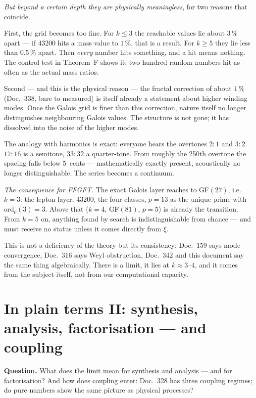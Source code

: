 \emph{But beyond a certain depth they are physically meaningless}, for two
reasons that coincide.

First, the grid becomes too fine. For $k \leq 3$ the reachable values lie
about $3\,\%$ apart --- if $43200$ hits a mass value to $1\,\%$, that is a
result. For $k \geq 5$ they lie less than $0.5\,\%$ apart. Then \emph{every}
number hits something, and a hit means nothing. The control test in
Theorem~F shows it: two hundred random numbers hit as often as the actual
mass ratios.

Second --- and this is the physical reason --- the fractal correction of about
$1\,\%$ (Doc.~338, bare to measured) is itself already a statement about
higher winding modes. Once the Galois grid is finer than this correction,
nature itself no longer distinguishes neighbouring Galois values. The
structure is not gone; it has dissolved into the noise of the higher modes.

The analogy with harmonics is exact: everyone hears the overtones $2{:}1$
and $3{:}2$. $17{:}16$ is a semitone, $33{:}32$ a quarter-tone. From roughly
the 250th overtone the spacing falls below 5~cents --- mathematically exactly
present, acoustically no longer distinguishable. The series becomes a continuum.

\emph{The consequence for FFGFT.} The exact Galois layer reaches to GF$(27)$,
i.e.\ $k = 3$: the lepton layer, $43200$, the four classes, $p = 13$ as the
unique prime with $\mathrm{ord}_p(3) = 3$. Above that ($k = 4$, GF$(81)$,
$p = 5$) is already the transition. From $k = 5$ on, anything found by search
is indistinguishable from chance --- and must receive no status unless it
comes directly from $\xi$.

This is not a deficiency of the theory but its consistency: Doc.~159 says mode
convergence, Doc.~316 says Weyl obstruction, Doc.~342 and this document say the
same thing algebraically. There is a limit, it lies at $k \approx 3$--$4$, and
it comes from the subject itself, not from our computational capacity.

\section{In plain terms II: synthesis, analysis, factorisation --- and coupling}

\textbf{Question.} What does the limit mean for synthesis and analysis --- and
for factorisation? And how does coupling enter: Doc.~328 has three coupling
regimes; do pure numbers show the same picture as physical processes?

